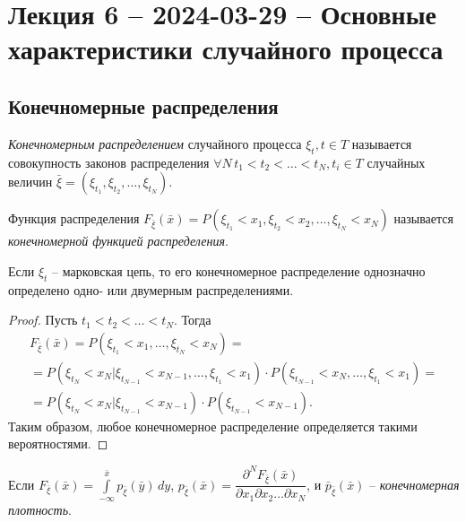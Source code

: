 \section{Лекция 6 -- 2024-03-29 -- Основные характеристики случайного процесса}

\subsection{Конечномерные распределения}

\begin{definition}
  \emph{Конечномерным распределением} случайного процесса $\xi_t, t\in T$ 
  называется совокупность законов распределения
  $\forall N \, t_1 < t_2 < \dots < t_N, t_i \in T$
  случайных величин $\bar{\xi} = (\xi_{t_1}, \xi_{t_2}, \dots, \xi_{t_N})$.

  Функция распределения
  $F_{\bar{\xi}} (\bar{x}) = P(\xi_{t_1} < x_1, \xi_{t_2} < x_2, \dots, \xi_{t_N} < x_N)$
  называется \emph{конечномерной функцией распределения}.
\end{definition}


\begin{theorem}
  Если $\xi_t$ -- марковская цепь, то его конечномерное распределение однозначно 
  определено одно- или двумерным распределениями.
\end{theorem}
\begin{proof}
  Пусть $t_1 < t_2 < \dots < t_N$. Тогда
  \begin{multline*}
    F_{\bar{\xi}} (\bar{x}) = P(\xi_{t_1} < x_1, \dots, \xi_{t_N} < x_N) = \\
    = P(\xi_{t_N} < x_N | \xi_{t_{N-1}} < x_{N-1}, \dots, \xi_{t_1} < x_1)
      \cdot P(\xi_{t_{N-1}} < x_{N}, \dots, \xi_{t_1} < x_1) = \\
    = P(\xi_{t_N} < x_N | \xi_{t_{N-1}} < x_{N-1}) \cdot P(\xi_{t_{N-1}} < x_{N-1}).
  \end{multline*}
  Таким образом, любое конечномерное распределение определяется такими вероятностями.
\end{proof}

\begin{definition}
  Если $F_{\bar{\xi}}(\bar{x}) = \int\limits_{-\infty}^{\bar{x}} p_{\bar{\xi}} (\bar{y}) \, dy$,
  $p_{\bar{\xi}} (\bar{x}) = \dfrac{\partial^N F_{\bar{\xi}} (\bar{x})}{\partial x_1 \partial x_2 \dots \partial x_N}$, и $\bar{p}_\bar{\xi} (\bar{x})$ -- \emph{конечномерная плотность}.
\end{definition}

